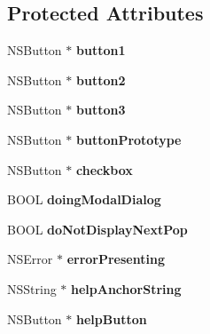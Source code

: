 \subsection*{Protected Attributes}
\begin{CompactItemize}
\item 
\hypertarget{interface_s_s_y_alert_0faaf3c3063f4a2e92a77ba7f9513294}{
NSButton $\ast$ \textbf{button1}}
\label{interface_s_s_y_alert_0faaf3c3063f4a2e92a77ba7f9513294}

\item 
\hypertarget{interface_s_s_y_alert_84d7323b18be5d034b5be50f4609a546}{
NSButton $\ast$ \textbf{button2}}
\label{interface_s_s_y_alert_84d7323b18be5d034b5be50f4609a546}

\item 
\hypertarget{interface_s_s_y_alert_bafab9e1e4bbc1e9e8a224eaabb78714}{
NSButton $\ast$ \textbf{button3}}
\label{interface_s_s_y_alert_bafab9e1e4bbc1e9e8a224eaabb78714}

\item 
\hypertarget{interface_s_s_y_alert_1eb7220eb9febd647279d0264ef44bea}{
NSButton $\ast$ \textbf{buttonPrototype}}
\label{interface_s_s_y_alert_1eb7220eb9febd647279d0264ef44bea}

\item 
\hypertarget{interface_s_s_y_alert_3ceda3d5adbbdfb7fe133acf2ba682a5}{
NSButton $\ast$ \textbf{checkbox}}
\label{interface_s_s_y_alert_3ceda3d5adbbdfb7fe133acf2ba682a5}

\item 
\hypertarget{interface_s_s_y_alert_3dd7eaef43a88e72b21e479872ca9f9c}{
BOOL \textbf{doingModalDialog}}
\label{interface_s_s_y_alert_3dd7eaef43a88e72b21e479872ca9f9c}

\item 
\hypertarget{interface_s_s_y_alert_287ec89d3f6a6268780fabf8fc65ee13}{
BOOL \textbf{doNotDisplayNextPop}}
\label{interface_s_s_y_alert_287ec89d3f6a6268780fabf8fc65ee13}

\item 
\hypertarget{interface_s_s_y_alert_f3b944a663c7ece6976180cb31f99bad}{
NSError $\ast$ \textbf{errorPresenting}}
\label{interface_s_s_y_alert_f3b944a663c7ece6976180cb31f99bad}

\item 
\hypertarget{interface_s_s_y_alert_84fdae8748a7b3f46bf0a5fd15bb8cbc}{
NSString $\ast$ \textbf{helpAnchorString}}
\label{interface_s_s_y_alert_84fdae8748a7b3f46bf0a5fd15bb8cbc}

\item 
\hypertarget{interface_s_s_y_alert_398980a229db9c84d7ef521183d62d77}{
NSButton $\ast$ \textbf{helpButton}}
\label{interface_s_s_y_alert_398980a229db9c84d7ef521183d62d77}


\end{CompactItemize}
